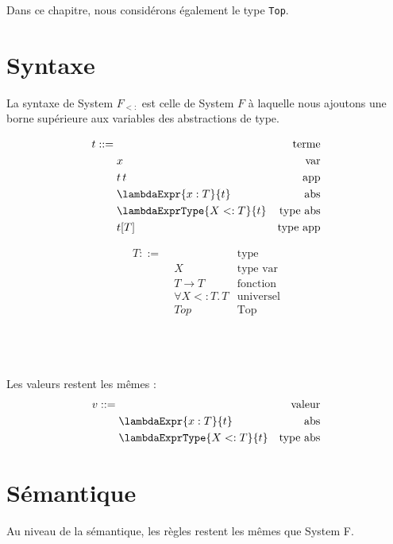 Dans ce chapitre, nous considérons également le type \verb|Top|.

\section{Syntaxe}

La syntaxe de System $F_{<:}$ est celle de System $F$ à laquelle nous ajoutons
une borne supérieure aux variables des abstractions de type.

\begin{minipage}{0.45\textwidth}
  \begin{align*}
    t ::= & \, & \text{terme} \\
          & \; x & \text{var} \\
          & \; t \, t & \text{app} \\
          & \; \lambdaExpr{x : T}{t} & \text{abs} \\
          & \; \lambdaExprType{X <: T}{t} & \text{type abs} \\
          & \; t[T] & \text{type app}
  \end{align*}
\end{minipage}
\begin{minipage}{0.45\textwidth}
  \begin{align*}
    T ::= & \, & \text{type} \\
          & \; X & \text{type var} \\
          & \; T \rightarrow T & \text{fonction} \\
          & \; \forall X <: T. \, T & \text{universel} \\
          & \; Top & \text{Top}
  \end{align*}
\end{minipage}
\\
\\
\\
Les valeurs restent les mêmes :
\begin{align*}
  v ::= & \, & \text{valeur} \\
        & \; \lambdaExpr{x : T}{t} & \text{abs} \\
        & \; \lambdaExprType{X <: T}{t} & \text{type abs}
\end{align*}

\section{Sémantique}

Au niveau de la sémantique, les règles restent les mêmes que System F.

